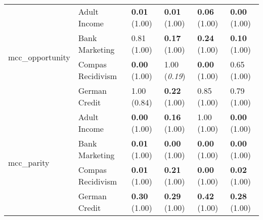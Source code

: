 \begin{tabular}{llllll}
\cline{1-6}
\multirow[t]{4}{*}{mcc_opportunity} & Adult Income & \textbf{0.01} (1.00) & \textbf{0.01} (1.00) & \textbf{0.06} (1.00) & \textbf{0.00} (1.00) \\
 & Bank Marketing & 0.81 (1.00) & \textbf{0.17} (1.00) & \textbf{0.24} (1.00) & \textbf{0.10} (1.00) \\
 & Compas Recidivism & \textbf{0.00} (1.00) & 1.00 (\textit{0.19}) & \textbf{0.00} (1.00) & 0.65 (1.00) \\
 & German Credit & 1.00 (0.84) & \textbf{0.22} (1.00) & 0.85 (1.00) & 0.79 (1.00) \\
\cline{1-6}
\multirow[t]{4}{*}{mcc_parity} & Adult Income & \textbf{0.00} (1.00) & \textbf{0.16} (1.00) & 1.00 (1.00) & \textbf{0.00} (1.00) \\
 & Bank Marketing & \textbf{0.01} (1.00) & \textbf{0.00} (1.00) & \textbf{0.00} (1.00) & \textbf{0.00} (1.00) \\
 & Compas Recidivism & \textbf{0.01} (1.00) & \textbf{0.21} (1.00) & \textbf{0.00} (1.00) & \textbf{0.02} (1.00) \\
 & German Credit & \textbf{0.30} (1.00) & \textbf{0.29} (1.00) & \textbf{0.42} (1.00) & \textbf{0.28} (1.00) \\
\cline{1-6}
\bottomrule
\end{tabular}
